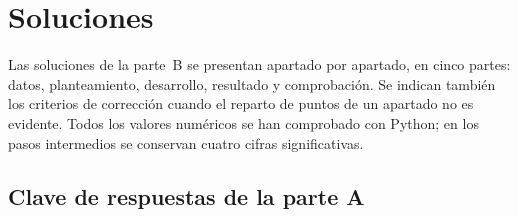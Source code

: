 \chapter{Soluciones}
\label{ap:soluciones}

Las soluciones de la parte~B se presentan apartado por apartado, en cinco partes: datos, planteamiento, desarrollo, resultado y comprobación. Se indican también los criterios de corrección cuando el reparto de puntos de un apartado no es evidente. Todos los valores numéricos se han comprobado con Python; en los pasos intermedios se conservan cuatro cifras significativas.

\section{Clave de respuestas de la parte A}


